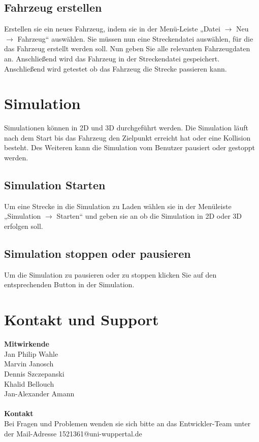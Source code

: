 \documentclass[11pt,a4paper]{article}
\begin{document}
\subsection{Fahrzeug erstellen}
Erstellen sie ein neues Fahrzeug, indem sie in der Menü-Leiste „Datei $\rightarrow$ Neu $\rightarrow$ Fahrzeug“ auswählen. Sie müssen nun eine Streckendatei auswählen, für die das Fahrzeug erstellt werden soll. Nun geben Sie alle relevanten Fahrzeugdaten an. Anschließend wird das Fahrzeug in der Streckendatei gespeichert. Anschließend wird getestet ob das Fahrzeug die Strecke passieren kann.
\newpage
\section{Simulation}
Simulationen können in 2D und 3D durchgeführt werden. Die Simulation läuft nach dem Start bis das Fahrzeug den Zielpunkt erreicht hat oder eine Kollision besteht.
Des Weiteren kann die Simulation vom Benutzer pausiert oder gestoppt werden.

\subsection{Simulation Starten}
Um eine Strecke in die Simulation zu Laden wählen sie in der Menüleiste „Simulation $\rightarrow$ Starten“ und geben sie an ob die Simulation in 2D oder 3D erfolgen soll.
\subsection{Simulation stoppen oder pausieren}
Um die Simulation zu pausieren oder zu stoppen klicken Sie auf den entsprechenden Button in der Simulation.
\newpage
\section{Kontakt und Support}
\textbf{Mitwirkende} \\ 
Jan Philip Wahle \\
Marvin Janosch \\
Dennis Szczepanski \\
Khalid Bellouch \\
Jan-Alexander Amann \\
\\
\textbf{Kontakt} \\ 
Bei Fragen und Problemen wenden sie sich bitte an das Entwickler-Team unter der Mail-Adresse 1521361@uni-wuppertal.de
\end{document}
